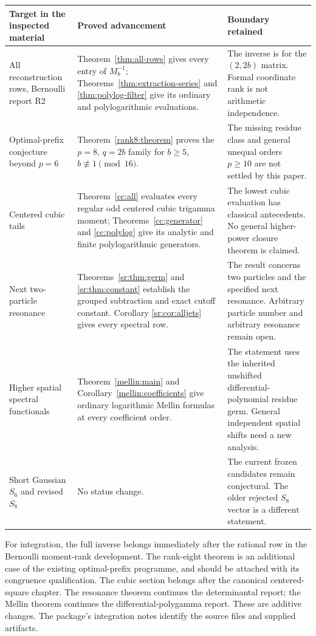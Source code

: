 \documentclass[11pt,letterpaper]{article}
\theoremstyle{definition}
\theoremstyle{remark}
\numberwithin{equation}{section}
\begin{document}
\begin{longtable}{@{}>{\raggedright\arraybackslash}p{}>{\raggedright\arraybackslash}p{}>{\raggedright\arraybackslash}p{}@{}}
\toprule
Target in the inspected material & Proved advancement & Boundary retained\\
\midrule
\endhead
All reconstruction rows, Bernoulli report R2 &
Theorem~\ref{thm:all-rows} gives every entry of $M_b^{-1}$;
Theorems~\ref{thm:extraction-series} and \ref{thm:polylog-filter}
give its ordinary and polylogarithmic evaluations. &
The inverse is for the $(2,2b)$ matrix. Formal coordinate rank is
not arithmetic independence.\\[.5em]
Optimal-prefix conjecture beyond $p=6$ &
Theorem~\ref{rank8:theorem} proves the $p=8$, $q=2b$ family
for $b\ge5$, $b\not\equiv1\pmod {16}$. &
The missing residue class and general unequal orders $p\ge10$
are not settled by this paper.\\[.5em]
Centered cubic tails &
Theorem~\ref{cc:all} evaluates every regular odd centered cubic
trigamma moment; Theorems~\ref{cc:generator} and \ref{cc:polylog}
give its analytic and finite polylogarithmic generators. &
The lowest cubic evaluation has classical antecedents.
No general higher-power closure theorem is claimed.\\[.5em]
Next two-particle resonance &
Theorems~\ref{sr:thm:germ} and \ref{sr:thm:constant} establish
the grouped subtraction and exact cutoff constant. Corollary
\ref{sr:cor:alljets} gives every spectral row. &
The result concerns two particles and the specified next resonance.
Arbitrary particle number and arbitrary resonance remain open.\\[.5em]
Higher spatial spectral functionals &
Theorem~\ref{mellin:main} and Corollary~\ref{mellin:coefficients}
give ordinary logarithmic Mellin formulas at every coefficient order. &
The statement uses the inherited unshifted differential-polynomial
residue germ. General independent spatial shifts need a new analysis.\\[.5em]
Short Gaussian $S_6$ and revised $S_8$ &
No status change. &
The current frozen candidates remain conjectural. The older rejected
$S_8$ vector is a different statement.\\
\bottomrule
\end{longtable}

For integration, the full inverse belongs immediately after the rational
row in the Bernoulli moment-rank development. The rank-eight theorem is
an additional case of the existing optimal-prefix programme, and should
be attached with its congruence qualification. The cubic section belongs
after the canonical centered-square chapter. The resonance theorem
continues the determinantal report; the Mellin theorem continues the
differential-polygamma report. These are additive changes. The package's
integration notes identify the source files and supplied artifacts.
\end{document}
